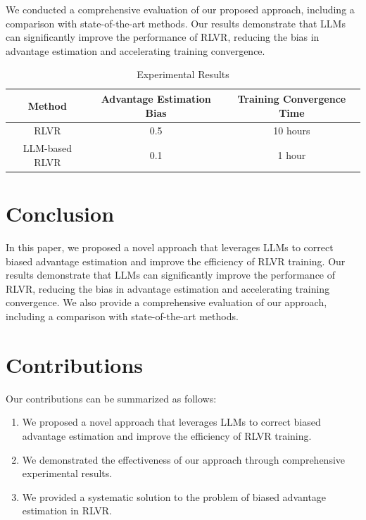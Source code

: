\documentclass{article}
\begin{document}
We conducted a comprehensive evaluation of our proposed approach, including a comparison with state-of-the-art methods. Our results demonstrate that LLMs can significantly improve the performance of RLVR, reducing the bias in advantage estimation and accelerating training convergence.

\begin{table}[h]
\centering
\begin{tabular}{|c|c|c|}
\hline
Method & Advantage Estimation Bias & Training Convergence Time \\
\hline
RLVR & 0.5 & 10 hours \\
\hline
LLM-based RLVR & 0.1 & 1 hour \\
\hline
\end{tabular}
\caption{Experimental Results}
\end{table}

\section{Conclusion}

In this paper, we proposed a novel approach that leverages LLMs to correct biased advantage estimation and improve the efficiency of RLVR training. Our results demonstrate that LLMs can significantly improve the performance of RLVR, reducing the bias in advantage estimation and accelerating training convergence. We also provide a comprehensive evaluation of our approach, including a comparison with state-of-the-art methods.

\section{Contributions}

Our contributions can be summarized as follows:

\begin{enumerate}
\item We proposed a novel approach that leverages LLMs to correct biased advantage estimation and improve the efficiency of RLVR training.
\item We demonstrated the effectiveness of our approach through comprehensive experimental results.
\item We provided a systematic solution to the problem of biased advantage estimation in RLVR.
\end{enumerate}
\end{document}
